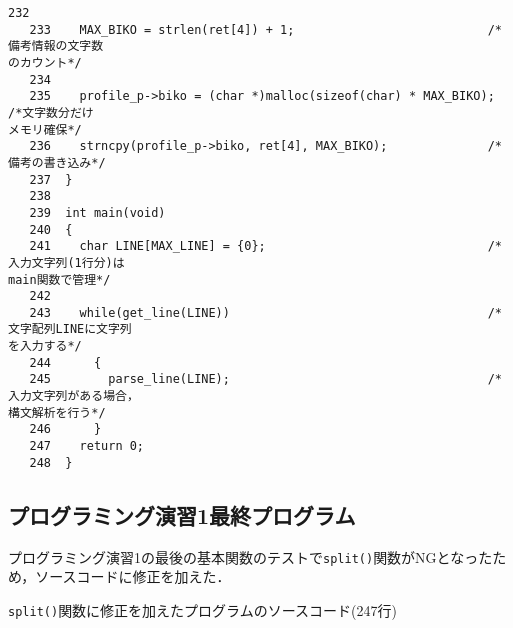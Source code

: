 \begin{Verbatim}[fontsize=\small, baselinestretch=0.8]
   232	
   233	  MAX_BIKO = strlen(ret[4]) + 1;                           /*備考情報の文字数
のカウント*/
   234	
   235	  profile_p->biko = (char *)malloc(sizeof(char) * MAX_BIKO); /*文字数分だけ
メモリ確保*/
   236	  strncpy(profile_p->biko, ret[4], MAX_BIKO);              /*備考の書き込み*/
   237	}
   238	
   239	int main(void)
   240	{
   241	  char LINE[MAX_LINE] = {0};                               /*入力文字列(1行分)は
main関数で管理*/
   242	
   243	  while(get_line(LINE))                                    /*文字配列LINEに文字列
を入力する*/
   244	    {
   245	      parse_line(LINE);                                    /*入力文字列がある場合，
構文解析を行う*/
   246	    }
   247	  return 0;
   248	}
\end{Verbatim}

\subsection{プログラミング演習1最終プログラム}\label{func6}

プログラミング演習1の最後の基本関数のテストで\verb|split()|関数がNGとなったため，ソースコードに修正を加えた．

\verb|split()|関数に修正を加えたプログラムのソースコード(247行)

